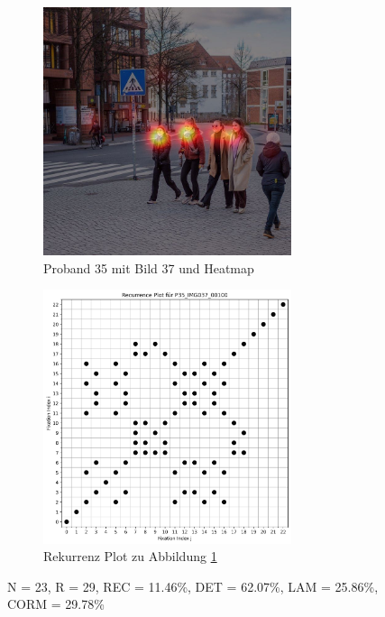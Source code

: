 \documentclass[
    language=german, %
    thesis=seminar, %
    supervisor=postdoc, %
    multiauthor=true, %
    ]{settings/csssa-thesis}
\begin{document}
\begin{figure}[ht]
    \centering
    \begin{subfigure}{0.49\textwidth}
        \centering
        \includegraphics[width=0.8\textwidth]{figures/Bild10.jpeg}
        \caption{Proband 35 mit Bild 37 und Heatmap}\label{fig:Bild10a}
    \end{subfigure}
    \begin{subfigure}{0.49\textwidth}
        \centering
        \includegraphics[width=0.8\textwidth]{figures/Bild11.jpeg}
        \caption{Rekurrenz Plot zu Abbildung \ref{fig:Bild10a}}\label{fig:Bild10b}
    \end{subfigure}\label{fig:Bild10}
    \caption{N = 23, R = 29, REC = 11.46\%, DET = 62.07\%, LAM = 25.86\%, CORM = 29.78\%}
\end{figure}
\end{document}
